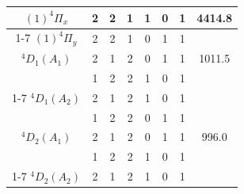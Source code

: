 \documentclass[12pt]{extarticle}
\begin{document}
\begin{table}[H]
\begin{tabular}{|c|cccccc|c|}
    		$(1)^4\Pi_x$               & 2                                       & 2                                       & 1                                       & 1                                      & 0                                      & 1                 & 4414.8           \\ \cline{1-7}
    		$(1)^4\Pi_y$               & 2                                       & 2                                       & 1                                       & 0                                      & 1                                      & 1                 &                  \\ \hline
    		$^4D_1 (A_1)$              & 2                                       & 1                                       & 2                                       & 0                                      & 1                                      & 1                 & 1011.5           \\
    		& 1                                       & 2                                       & 2                                       & 1                                      & 0                                      & 1                 &                  \\ \cline{1-7}
    		$^4D_1 (A_2)$              & 2                                       & 1                                       & 2                                       & 1                                      & 0                                      & 1                 &                  \\
    		& 1                                       & 2                                       & 2                                       & 0                                      & 1                                      & 1                 &                  \\ \hline
    		$^4D_2 (A_1)$              & 2                                       & 1                                       & 2                                       & 0                                      & 1                                      & 1                 & 996.0            \\
    		& 1                                       & 2                                       & 2                                       & 1                                      & 0                                      & 1                 &                  \\ \cline{1-7}
    		$^4D_2 (A_2)$              & 2                                       & 1                                       & 2                                       & 1                                      & 0                                      & 1                 &                  \\

\end{tabular}
\end{table}
\end{document}
